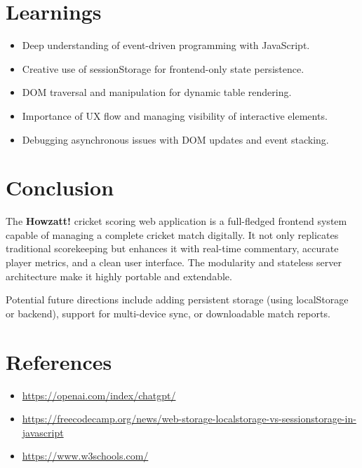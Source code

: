 \documentclass[a4paper,10pt]{article}
\begin{document}
\section{Learnings}
\begin{itemize}
    \item Deep understanding of event-driven programming with JavaScript.
    \item Creative use of sessionStorage for frontend-only state persistence.
    \item DOM traversal and manipulation for dynamic table rendering.
    \item Importance of UX flow and managing visibility of interactive elements.
    \item Debugging asynchronous issues with DOM updates and event stacking.
\end{itemize}

\section{Conclusion}
The \textbf{Howzatt!} cricket scoring web application is a full-fledged frontend system capable of managing a complete cricket match digitally. It not only replicates traditional scorekeeping but enhances it with real-time commentary, accurate player metrics, and a clean user interface. The modularity and stateless server architecture make it highly portable and extendable. 

Potential future directions include adding persistent storage (using localStorage or backend), support for multi-device sync, or downloadable match reports.

\section*{References}
\begin{itemize}
    \item \url{https://openai.com/index/chatgpt/}
    \item \url{https://freecodecamp.org/news/web-storage-localstorage-vs-sessionstorage-in-javascript}
    \item \url{https://www.w3schools.com/}
\end{itemize}
\end{document}
